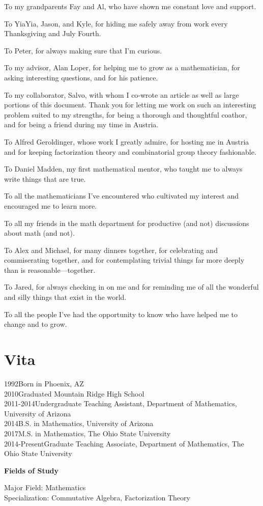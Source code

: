 To my grandparents Fay and Al, who have shown me constant love and support.

To YiaYia, Jason, and Kyle, for hiding me safely away from work every Thanksgiving and July Fourth.

To Peter, for always making sure that I'm curious.

To my advisor, Alan Loper, for helping me to grow as a mathematician, for asking interesting questions, and for his patience.

To my collaborator, Salvo, with whom I co-wrote an article as well as large portions of this document.
Thank you for letting me work on such an interesting problem suited to my strengths, for being a thorough and thoughtful coathor, and for being a friend during my time in Austria.

To Alfred Geroldinger, whose work I greatly admire, for hosting me in Austria and for keeping factorization theory and combinatorial group theory fashionable.

To Daniel Madden, my first mathematical mentor, who taught me to always write things that are true.

To all the mathematicians I've encountered who cultivated my interest and encouraged me to learn more.

To all my friends in the math department for productive (and not) discussions about math (and not).

To Alex and Michael, for many dinners together, for celebrating and commiserating together, and for contemplating trivial things far more deeply than is reasonable---together.

To Jared, for always checking in on me and for reminding me of all the wonderful and silly things that exist in the world.

To all the people I've had the opportunity to know who have helped me to change and to grow.






\chapter{Vita}
1992\dotfill  Born in Phoenix, AZ \\
2010\dotfill Graduated Mountain Ridge High School \\
2011-2014\dotfill Undergraduate Teaching Assistant, Department of Mathematics, University of Arizona  \\
2014\dotfill B.S. in Mathematics, University of Arizona \\
2017\dotfill M.S. in Mathematics, The Ohio State University \\
2014-Present\dotfill Graduate Teaching Associate, Department of Mathematics, The Ohio State University \\

\begin{center}
{ \LARGE \bf Fields of Study}
\end{center}
Major Field: Mathematics\\
Specialization: Commutative Algebra, Factorization Theory